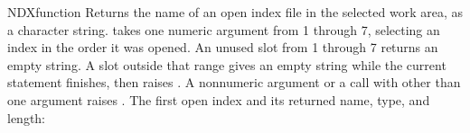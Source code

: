 \begin{XbaseEntry}{NDX}{function}
Returns the name of an open index file in the selected work area, as a character string.
\Syntax
{}
\Usage
{} takes one numeric argument from 1 through 7, selecting an index in
the order it was opened. An unused slot from 1 through 7 returns an empty
string. A slot outside that range gives an empty string while the current
statement finishes, then raises .
A nonnumeric argument or a call with other than one argument raises
.
\Examples
The first open index and its returned name, type, and length:
\end{XbaseEntry}
